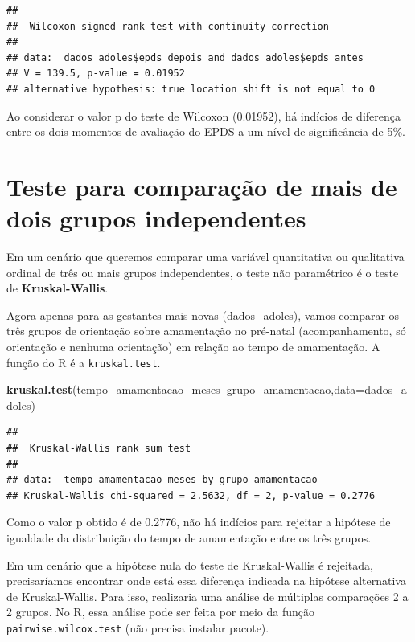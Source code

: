 \documentclass[
]{book}
\newenvironment{Shaded}{\begin{snugshade}}{\end{snugshade}}
\newcommand{\DataTypeTok}[1]{\textcolor[rgb]{0.13,0.29,0.53}{#1}}
\newcommand{\KeywordTok}[1]{\textcolor[rgb]{0.13,0.29,0.53}{\textbf{#1}}}
\newcommand{\NormalTok}[1]{#1}
\newcommand{\OperatorTok}[1]{\textcolor[rgb]{0.81,0.36,0.00}{\textbf{#1}}}
\begin{document}
\begin{verbatim}
## 
## 	Wilcoxon signed rank test with continuity correction
## 
## data:  dados_adoles$epds_depois and dados_adoles$epds_antes
## V = 139.5, p-value = 0.01952
## alternative hypothesis: true location shift is not equal to 0
\end{verbatim}

Ao considerar o valor p do teste de Wilcoxon (0.01952), há indícios de diferença entre os dois momentos de avaliação do EPDS a um nível de significância de 5\%.

\hypertarget{teste-para-comparauxe7uxe3o-de-mais-de-dois-grupos-independentes}{%
\section{Teste para comparação de mais de dois grupos independentes}\label{teste-para-comparauxe7uxe3o-de-mais-de-dois-grupos-independentes}}

Em um cenário que queremos comparar uma variável quantitativa ou qualitativa ordinal de três ou mais grupos independentes, o teste não paramétrico é o teste de \textbf{Kruskal-Wallis}.

Agora apenas para as gestantes mais novas (dados\_adoles), vamos comparar os três grupos de orientação sobre amamentação no pré-natal (acompanhamento, só orientação e nenhuma orientação) em relação ao tempo de amamentação. A função do R é a \texttt{kruskal.test}.

\begin{Shaded}
\begin{Highlighting}[]
\KeywordTok{kruskal.test}\NormalTok{(tempo_amamentacao_meses}\OperatorTok{~}\NormalTok{grupo_amamentacao,}\DataTypeTok{data=}\NormalTok{dados_adoles)}
\end{Highlighting}
\end{Shaded}

\begin{verbatim}
## 
## 	Kruskal-Wallis rank sum test
## 
## data:  tempo_amamentacao_meses by grupo_amamentacao
## Kruskal-Wallis chi-squared = 2.5632, df = 2, p-value = 0.2776
\end{verbatim}

Como o valor p obtido é de 0.2776, não há indícios para rejeitar a hipótese de igualdade da distribuição do tempo de amamentação entre os três grupos.

Em um cenário que a hipótese nula do teste de Kruskal-Wallis é rejeitada, precisaríamos encontrar onde está essa diferença indicada na hipótese alternativa de Kruskal-Wallis. Para isso, realizaria uma análise de múltiplas comparações 2 a 2 grupos. No R, essa análise pode ser feita por meio da função \texttt{pairwise.wilcox.test} (não precisa instalar pacote).
\end{document}
